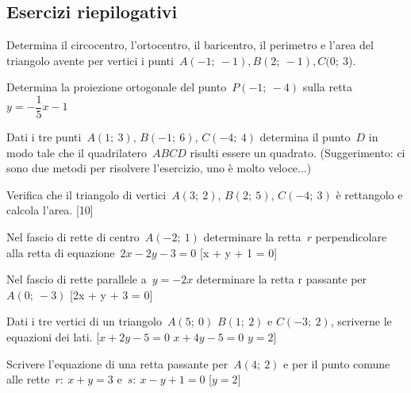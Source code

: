 \subsection{Esercizi riepilogativi}

\begin{esercizio}\label{ese:02_01.}
Determina il circocentro, l'ortocentro, il baricentro, il perimetro e l'area 
del triangolo avente per vertici i punti~\(A(-1;~-1), B(2;~-1 ), C(0;~3\)).  
\end{esercizio}

\begin{esercizio}\label{ese:02_01.}
Determina la proiezione ortogonale del punto~\(P(-1;~-4)\) sulla 
retta~\(y = - \dfrac{1}{5} x - 1\) 
\end{esercizio}

\begin{esercizio}\label{ese:02_01.}
Dati i tre punti~\(A(1;~3)\), \(B(-1;~6)\), \(C(-4;~4)\) 
determina il punto~\(D\) in modo tale che il quadrilatero~\(ABCD\) risulti essere 
un quadrato. 
(Suggerimento: ci sono due metodi per risolvere l'esercizio, uno è molto 
veloce...) 
\end{esercizio}

\begin{esercizio}\label{ese:02_01.}
Verifica che il triangolo di vertici~\(A(3;~2)\), \(B(2;~5)\), \(C(-4;~3)\) è 
rettangolo e calcola l'area. \hfill[10]
\end{esercizio}

\begin{esercizio}\label{ese:02_01.}
Nel fascio di rette di centro~\(A(-2;~1)\) determinare la retta~\(r\) 
perpendicolare alla retta di equazione~\(2x - 2y - 3 = 0\) \hfill[x + y + 1 = 0]
\end{esercizio}

\begin{esercizio}\label{ese:02_01.}
Nel fascio di rette parallele a~\(y = -2x\) determinare la retta r 
passante per~\(A(0;~-3)\) \hfill[2x + y + 3 = 0]
\end{esercizio}

\begin{esercizio}\label{ese:02_01.}
Dati i tre vertici di un triangolo~\(A(5;~0)\) \(B(1;~2)\) e \(C(-3;~2)\), 
scriverne le equazioni dei lati.
 \hfill[\(x + 2y - 5 = 0\)  \(x + 4 y - 5 = 0\) \(y = 2\)]
\end{esercizio}

\begin{esercizio}\label{ese:02_01.}
Scrivere l'equazione di una retta passante per~\(A(4;~2)\) 
e per il punto comune alle rette~\(r:~x + y = 3\) e~\(s:~x - y + 1 = 0\)
\hfill[\(y = 2\)]
\end{esercizio}


